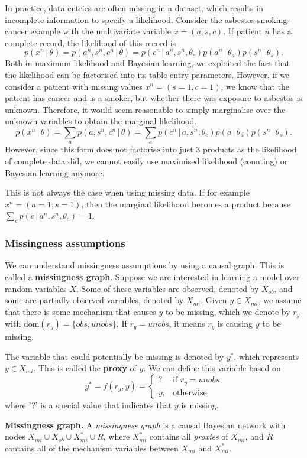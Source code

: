 \documentclass{article}
\newcommand{\giv}{\,|\,}
\begin{document}
In practice, data entries are often missing in a dataset, which results in incomplete information to specify a likelihood. Consider the asbestos-smoking-cancer example with the multivariate variable $x = (a, s, c)$. If patient $n$ has a complete record, the likelihood of this record is
$$
    p(x^n \giv \theta) = p(a^n, s^n, c^n \giv \theta) = p(c^n \giv a^n, s^n, \theta_c) p(a^n \giv \theta_a) p(s^n \giv \theta_s).
$$
\noindent Both in maximum likelihood and Bayesian learning, we exploited the fact that the likelihood can be factorised into its table entry parameters. However, if we consider a patient with missing values $x^n = (s = 1, c = 1)$, we know that the patient has cancer and is a smoker, but whether there was exposure to asbestos is unknown. Therefore, it would seem reasonable to simply marginalise over the unknown variables to obtain the marginal likelihood.
$$
    p(x^n \giv \theta) = \sum_a p(a, s^n, c^n \giv \theta) = \sum_a p(c^n \giv a, s^n, \theta_c) p(a \giv \theta_a) p(s^n \giv \theta_s).
$$
\noindent However, since this form does not factorise into just 3 products as the likelihood of complete data did, we cannot easily use maximised likelihood (counting) or Bayesian learning anymore. 

This is not always the case when using missing data. If for example $x^n = (a = 1, s = 1)$, then the marginal likelihood becomes a product because $\sum_c p(c \giv a^n, s^n, \theta_c) = 1$. 

\subsubsection{Missingness assumptions}

We can understand missingness assumptions by using a causal graph. This is called a \textbf{missingness graph}. Suppose we are interested in learning a model over random variables $X$. Some of these variables are observed, denoted by $X_{ob}$, and some are partially observed variables, denoted by $X_{mi}$. Given $y \in X_{mi}$, we assume that there is some mechanism that causes $y$ to be missing, which we denote by $r_y$ with $\text{dom}(r_y) = \{obs, unobs\}$. If $r_y = unobs$, it means $r_y$ is causing $y$ to be missing. 

The variable that could potentially be missing is denoted by $y^*$, which represents $y \in X_{mi}$. This is called the \textbf{proxy} of $y$. We can define this variable based on
$$
    y^* = f(r_y, y) =
        \begin{cases}
            ? & \text{if } r_y = unobs \\
            y, & \text{otherwise}
        \end{cases}
$$
\noindent where '?' is a special value that indicates that $y$ is missing. 
\\
\begin{theorem}
    \textbf{Missingness graph.} A \textit{missingness graph} is a causal Bayesian network with nodes $X_{mi} \cup X_{ob} \cup X_{mi}^* \cup R$, where $X_{mi}^*$ contains all \textit{proxies} of $X_{mi}$, and $R$ contains all of the mechanism variables between $X_{mi}$ and $X_{mi}^*$.
\end{theorem}
\end{document}
